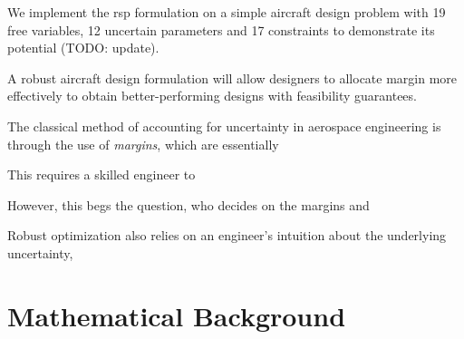 We implement the \gls{rsp} formulation on a simple aircraft design problem with 19 free variables,
12 uncertain parameters and 17 constraints to demonstrate its potential (TODO: update).

A robust aircraft design formulation will allow designers to allocate margin more effectively
to obtain better-performing designs with feasibility guarantees.


The classical method of accounting for uncertainty in aerospace engineering is through
the use of \textit{margins}, which are essentially

This requires a skilled engineer to

However, this begs the question, who decides on the margins and

Robust optimization also relies on an engineer's intuition about the underlying uncertainty,

\section{Mathematical Background}
